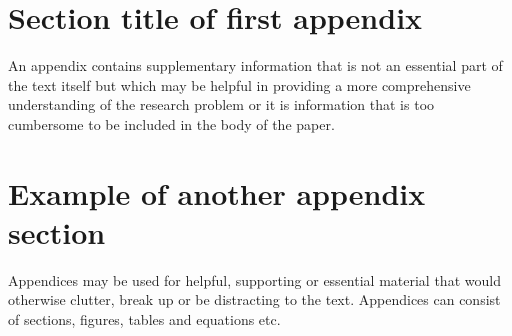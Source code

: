 \documentclass[pdflatex,sn-nature]{sn-jnl}%
\begin{document}
\begin{appendices}

\section{Section title of first appendix}

An appendix contains supplementary information that is not an essential part of the text itself but which may be helpful in providing a more comprehensive understanding of the research problem or it is information that is too cumbersome to be included in the body of the paper.



\section{Example of another appendix section}
Appendices may be used for helpful, supporting or essential material that would otherwise 
clutter, break up or be distracting to the text. Appendices can consist of sections, figures, 
tables and equations etc.

\end{appendices}

\end{document}
